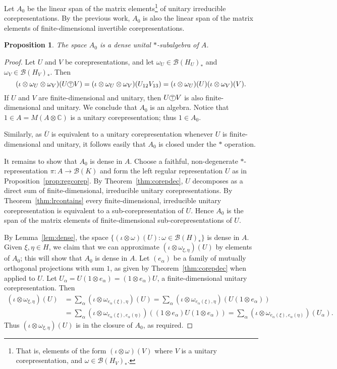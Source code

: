 \documentclass[twoside,a4paper,12pt]{article}
\theoremstyle{plain}
\newtheorem{proposition}{Proposition}[section]
\theoremstyle{definition}
\newcommand{\mc}{\mathcal}
\newcommand{\cotp}{\xymatrix{*+<.7ex>[o][F-]{\scriptstyle\top}}}
\begin{document}
Let $A_0$ be the linear span of the matrix elements\footnote{That is,
elements of the form $(\iota\otimes\omega)(V)$ where $V$ is a unitary
corepresentation, and $\omega\in\mc B(H_V)_*$.} of unitary irreducible
corepresentations.  By the previous work, $A_0$ is also the linear
span of the matrix elements of finite-dimensional invertible
corepresentations.

\begin{proposition}
The space $A_0$ is a dense unital $*$-subalgebra of $A$.
\end{proposition}
\begin{proof}
Let $U$ and $V$ be corepresentations, and let $\omega_U\in\mc B(H_U)_*$
and $\omega_V\in\mc B(H_V)_*$.  Then
\[ (\iota\otimes\omega_U\otimes\omega_V)(U \cotp V)
= (\iota\otimes\omega_U\otimes\omega_V)(U_{12} V_{13})
= (\iota\otimes\omega_U)(U) (\iota\otimes\omega_V)(V). \]
If $U$ and $V$ are finite-dimensional and unitary, then $U\cotp V$ is
also finite-dimensional and unitary.  We conclude that $A_0$ is an algebra.
Notice that $1\in A = M(A\otimes\mathbb C)$ is a unitary corepresentation;
thus $1\in A_0$.

Similarly, as $\overline{U}$ is equivalent to a unitary corepresentation
whenever $U$ is finite-dimensional and unitary, it follows easily that
$A_0$ is closed under the $*$ operation.

It remains to show that $A_0$ is dense in $A$.  Choose a faithful,
non-degenerate $*$-representation $\pi:A\rightarrow\mc B(K)$ and form the
left regular representation $U$ as in Proposition~\ref{prop:regcorep}.
By Theorem~\ref{thm:corepdec}, $U$ decomposes as a direct sum of
finite-dimensional, irreducible unitary corepresentations.  By
Theorem~\ref{thm:lrcontains} every finite-dimensional, irreducible unitary 
corepresentation is equivalent to a sub-corepresentation of $U$.  Hence $A_0$
is the span of the matrix elements of finite-dimensional sub-corepresentations
of $U$.

By Lemma~\ref{lem:dense}, the space $\{ (\iota\otimes\omega)(U) :
\omega\in\mc B(H)_* \}$ is dense in $A$.  Given $\xi,\eta\in H$, we claim
that we can approximate $(\iota\otimes\omega_{\xi,\eta})(U)$ by elements of
$A_0$; this will show that $A_0$ is dense in $A$.  Let $(e_\alpha)$ be a
family of mutually orthogonal projections with sum $1$, as given by
Theorem~\ref{thm:corepdec} when applied to $U$.  Let $U_\alpha
= U(1\otimes e_\alpha) = (1\otimes e_\alpha) U$, a finite-dimensional
unitary corepresentation.  Then
\begin{align*} (\iota\otimes\omega_{\xi,\eta})(U)
&= \sum_\alpha (\iota\otimes\omega_{e_\alpha(\xi),\eta})(U)
= \sum_\alpha (\iota\otimes\omega_{e_\alpha(\xi),\eta})(U(1\otimes e_\alpha))
\\
&= \sum_\alpha (\iota\otimes\omega_{e_\alpha(\xi),e_\alpha(\eta)})
   ((1\otimes e_\alpha)U(1\otimes e_\alpha))
= \sum_\alpha (\iota\otimes\omega_{e_\alpha(\xi),e_\alpha(\eta)})(U_\alpha).
\end{align*}
Thus $(\iota\otimes\omega_{\xi,\eta})(U)$ is in the closure of $A_0$,
as required.
\end{proof}
\end{document}
